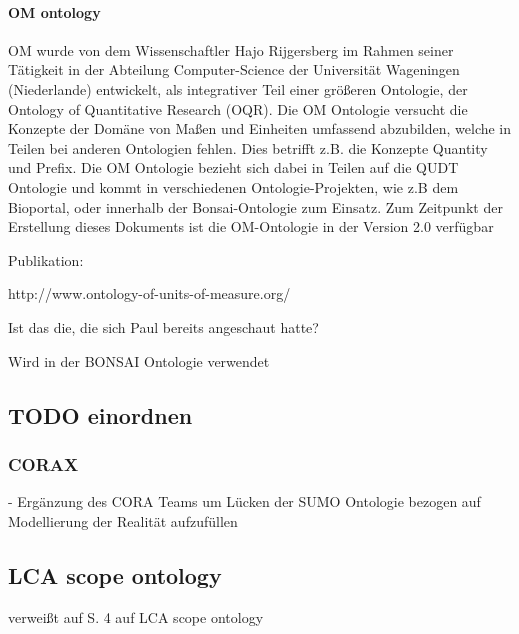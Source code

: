 \documentclass{article}
\begin{document}
\paragraph{OM ontology}
\vspace{1em} %

OM wurde von dem Wissenschaftler Hajo Rijgersberg im Rahmen seiner Tätigkeit in der Abteilung Computer-Science der Universität Wageningen (Niederlande) entwickelt, als integrativer Teil einer größeren Ontologie\cite{rijgersberg2013ontology}, der Ontology of Quantitative Research (OQR).
Die OM Ontologie versucht die Konzepte der Domäne von Maßen und Einheiten umfassend abzubilden, welche in Teilen bei anderen 
Ontologien fehlen. Dies betrifft z.B. die Konzepte Quantity und Prefix. Die OM Ontologie bezieht sich dabei in Teilen auf die QUDT Ontologie und kommt in verschiedenen Ontologie-Projekten, wie z.B dem Bioportal\cite{OM_BioPortal}, oder innerhalb der Bonsai-Ontologie \cite{ghose2022core} zum Einsatz.
Zum Zeitpunkt der Erstellung dieses Dokuments ist die OM-Ontologie in der Version 2.0 verfügbar




Publikation: \cite{rijgersberg2013ontology}

http://www.ontology-of-units-of-measure.org/

Ist das die, die sich Paul bereits angeschaut hatte?

Wird in der BONSAI Ontologie \cite{ghose2022core} verwendet


\subsection{TODO einordnen}

\subsubsection{CORAX}

- Ergänzung des CORA Teams um Lücken der SUMO Ontologie bezogen auf Modellierung der Realität aufzufüllen

\subsection{LCA scope ontology}

\cite{vardem2015anminimal} verweißt auf S. 4 auf LCA scope ontology
\end{document}
